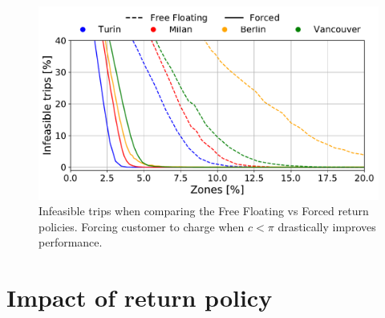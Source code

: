 \begin{figure}[t!]
    \begin{center}
            \includegraphics[width=0.95\columnwidth]{figures/DeathsVsZones_city.pdf}
         \caption{Infeasible trips when comparing the Free Floating vs Forced return policies. Forcing customer to charge when $c<\pi$ drastically improves performance.}
         \label{fig:zone_vs_deaths_FF_N}
\end{center}
\end{figure}

\section{Impact of return policy}
\label{sec:results}


